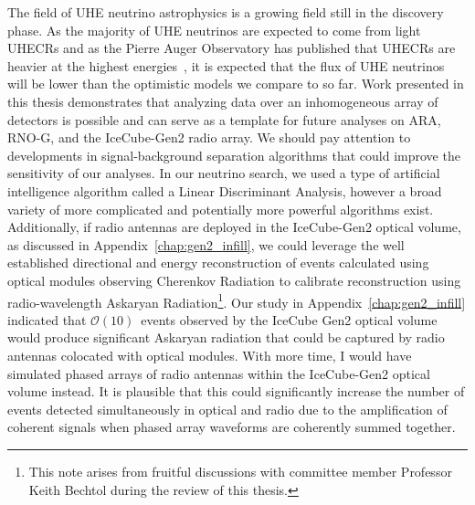 The field of UHE neutrino astrophysics is a growing field still in the discovery phase. 
As the majority of UHE neutrinos are expected to come from light UHECRs and as the Pierre Auger Observatory has published that UHECRs are heavier at the highest energies~\citep{pao_mass_composition}, it is expected that the flux of UHE neutrinos will be lower than the optimistic models we compare to so far. 
Work presented in this thesis demonstrates that analyzing data over an inhomogeneous array of detectors is possible and can serve as a template for future analyses on ARA, \mbox{RNO-G}, and the IceCube-Gen2 radio array.
We should pay attention to developments in signal-background separation algorithms that could improve the sensitivity of our analyses.
In our neutrino search, we used a type of artificial intelligence algorithm called a Linear Discriminant Analysis, however a broad variety of more complicated and potentially more powerful algorithms exist. 
Additionally, if radio antennas are deployed in the IceCube-Gen2 optical volume, as discussed in Appendix~\ref{chap:gen2_infill}, we could leverage the well established directional and energy reconstruction of events calculated using optical modules observing Cherenkov Radiation to calibrate reconstruction using radio-wavelength Askaryan Radiation\footnote{This note arises from fruitful discussions with committee member Professor Keith Bechtol during the review of this thesis.}.
Our study in Appendix~\ref{chap:gen2_infill} indicated that $\mathcal{O}(10)$~events observed by the IceCube Gen2 optical volume would produce significant Askaryan radiation that could be captured by radio antennas colocated with optical modules.
With more time, I would have simulated phased arrays of radio antennas within the IceCube-Gen2 optical volume instead. 
It is plausible that this could significantly increase the number of events detected simultaneously in optical and radio due to the amplification of coherent signals when phased array waveforms are coherently summed together.


